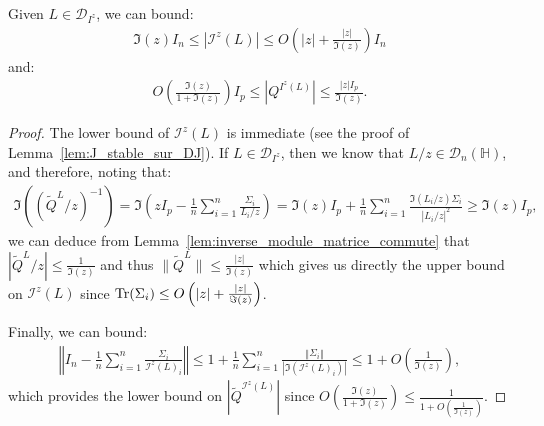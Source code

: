 \documentclass[a4papaer, titlepage]{book}
\begin{document}
\begin{lemma}\label{lem:borne_L_I^z}
  Given $L \in \mathcal D_{I^z}$, we can bound:
  \begin{align*}
    \Im(z) I_n \leq |\mathcal I^z(L)| \leq O \left(|z| + \frac{|z|}{\Im(z)}\right) I_n
  \end{align*}
  and:
  \begin{align*}
    O \left(\frac{\Im(z)}{1+\Im(z)}\right) I_p 
    \leq \left\vert Q^{I^z(L)}\right\vert \leq \frac{|z|I_p}{\Im(z)}.
  \end{align*}
\end{lemma}
\begin{proof}
The lower bound of $\mathcal I^z(L)$ is immediate (see the proof of Lemma~\ref{lem:J_stable_sur_DJ}).
  If $L \in \mathcal D_{I^z}$, then we know that $L/z \in \mathcal D_n(\mathbb H)$, and therefore, noting that:
  \begin{align*}
     \Im \left( (\tilde Q^L/z)^{-1}\right) = \Im\left(zI_p - \frac{1}{n } \sum_{i=1}^n \frac{\Sigma_i}{L_i/z}\right) = \Im(z)I_p + \frac{1}{n } \sum_{i=1}^n \frac{\Im(L_i/z)\Sigma_i}{|L_i/z|^2} \geq \Im(z)I_p,
   \end{align*}
   we can deduce from Lemma~\ref{lem:inverse_module_matrice_commute} that $|\tilde Q^L/z| \leq \frac{1}{\Im(z)}$ and thus $\|\tilde Q^L\| \leq \frac{|z|}{\Im(z)}$ which gives us directly the upper bound on $\mathcal I^z(L)$ since $\operatorname{Tr}(\Sigma_i) \leq O \left(|z| + \frac{|z|}{\Im(z)}\right)$.





  Finally, we can bound:
  \begin{align*}
    \left\Vert I_n - \frac{1}{n} \sum_{i=1}^n \frac{\Sigma_i}{\mathcal I^z(L)_i}\right\Vert
    \leq 1 + \frac{1}{n} \sum_{i=1}^n \frac{\left\Vert \Sigma_i \right\Vert}{ | \Im(\mathcal I^z(L)_i)|} 
    \leq 1 + O \left( \frac{1}{\Im(z)} \right),
  \end{align*}
  which provides the lower bound on $|\tilde Q^{\mathcal I^z(L)}|$ since $O \left(\frac{\Im(z)}{1+\Im(z)}\right)  \leq \frac{1}{1 + O(\frac{1}{\Im(z)} )} $.
\end{proof}
\end{document}
